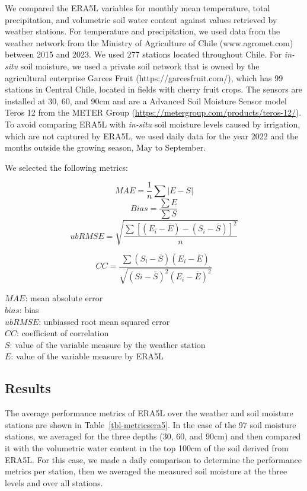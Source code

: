 \documentclass[
  authoryear,
  preprint,
  3p,
  onecolumn]{elsarticle}
\begin{document}
We compared the ERA5L \citep{MunozSabater2021} variables for monthly
mean temperature, total precipitation, and volumetric soil water content
against values retrieved by weather stations. For temperature and
precipitation, we used data from the weather network from the Ministry
of Agriculture of Chile (www.agromet.com) between 2015 and 2023. We used
277 stations located throughout Chile. For \emph{in-situ} soil moisture,
we used a private soil network that is owned by the agricultural
enterprise Garces Fruit (https://garcesfruit.com/), which has 99
stations in Central Chile, located in fields with cherry fruit crops.
The sensors are installed at 30, 60, and 90cm and are a Advanced Soil
Moisture Sensor model Teros 12 from the METER Group
(\url{https://metergroup.com/products/teros-12/}). To avoid comparing
ERA5L with \emph{in-situ} soil moisture levels caused by irrigation,
which are not captured by ERA5L, we used daily data for the year 2022
and the months outside the growing season, May to September.

We selected the following metrics:

\[MAE = \frac{1}{n}\sum |{E-S}|\] \[Bias = \frac{\sum E}{\sum S}\]
\[ubRMSE =\sqrt{\frac{\sum{ \left[ (E_i-\overline{E})-(S_i-\overline{S}) \right ] ^2}}{n}}\]

\[CC = \frac{\sum (S_i-\bar{S})(E_i-\bar{E})}{\sqrt{(Si-\bar{S})^2(E_i-\bar{E})^2}}\]

\(MAE\): mean absolute error\\
\(bias\): bias\\
\(ubRMSE\): unbiassed root mean squared error\\
\(CC\): coefficient of correlation\\
\(S\): value of the variable measure by the weather station\\
\(E\): value of the variable measure by ERA5L

\subsection{Results}\label{results-1}

The average performance metrics of ERA5L over the weather and soil
moisture stations are shown in Table~\ref{tbl-metricsera5}. In the case
of the 97 soil moisture stations, we averaged for the three depths (30,
60, and 90cm) and then compared it with the volumetric water content in
the top 100cm of the soil derived from ERA5L. For this case, we made a
daily comparison to determine the performance metrics per station, then
we averaged the measured soil moisture at the three levels and over all
stations.
\end{document}
